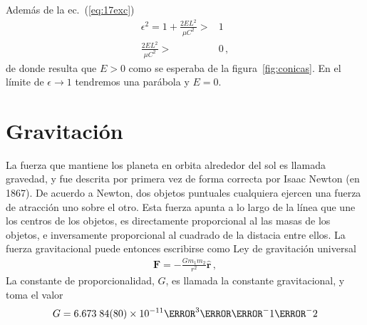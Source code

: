 Además de la ec.~(\ref{eq:17exc})
\begin{align}
  \epsilon^2=1+\frac{2EL^2}{\mu C^2}>&1\nonumber\\
  \frac{2EL^2}{\mu C^2}>&0\,,
\end{align}
de donde resulta que $E>0$ como se esperaba de la figura~\ref{fig:conicas}. En el límite de $\epsilon\to 1$ tendremos una parábola y $E=0$.

 
\section{Gravitación}

\begin{frame}
La fuerza que mantiene los planeta en orbita alrededor del sol es llamada gravedad, y fue descrita por primera vez de forma correcta por Isaac Newton (en 1867). De acuerdo a Newton, dos objetos puntuales cualquiera ejercen una fuerza de atracción uno sobre el otro. Esta fuerza apunta a lo largo de la línea que une los centros de los objetos, es directamente proporcional al las masas de los objetos, e inversamente proporcional al cuadrado de la distacia entre ellos. La fuerza gravitacional puede entonces escribirse como 
Ley de gravitación universal
\begin{align}
  \label{eq:gravu}
  \mathbf{F}=-\frac{Gm_1m_2}{r^2}\hat{\mathbf{r}}\,,
\end{align}
La constante de proporcionalidad, $G$, es llamada la constante gravitacional, y toma el valor
\begin{equation}
  G=6.673\;84(80)\times 10^{-11}\meter^3\kilo\gram^-1\second^-2
\end{equation}
\end{frame}


